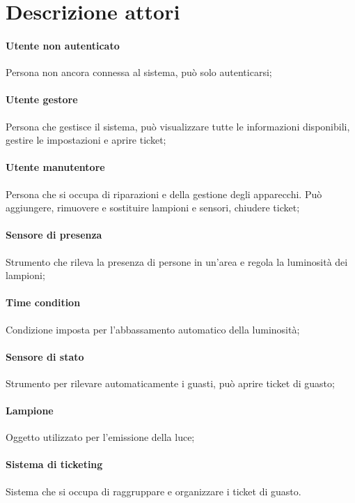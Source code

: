 \section{Descrizione attori}
\paragraph{Utente non autenticato} 
Persona non ancora connessa al sistema, può solo autenticarsi;

\paragraph{Utente gestore} 
Persona che gestisce il sistema, può visualizzare tutte le informazioni disponibili, gestire le impostazioni e aprire ticket;

\paragraph{Utente manutentore} 
Persona che si occupa di riparazioni e della gestione degli apparecchi. Può aggiungere, rimuovere e sostituire lampioni e sensori, chiudere ticket;

\paragraph{Sensore di presenza} 
Strumento che rileva la presenza di persone in un'area e regola la luminosità dei lampioni;

\paragraph{Time condition}
Condizione imposta per l'abbassamento automatico della luminosità;

\paragraph{Sensore di stato} 
Strumento per rilevare automaticamente i guasti, può aprire ticket di guasto;

\paragraph{Lampione} 
Oggetto utilizzato per l'emissione della luce;

\paragraph{Sistema di ticketing}
Sistema che si occupa di raggruppare e organizzare i ticket di guasto.

